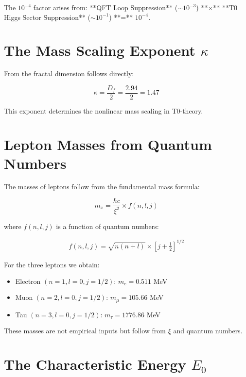 \documentclass[12pt,a4paper]{report}
\begin{document}
The $10^{-4}$ factor arises from: **QFT Loop Suppression** ($\sim 10^{-3}$) **×** **T0 Higgs Sector Suppression** ($\sim 10^{-1}$) **=** $10^{-4}$.

	\section{The Mass Scaling Exponent $\kappa$}
	
	From the fractal dimension follows directly:
	
	\begin{equation}
		\kappa = \frac{D_f}{2} = \frac{2.94}{2} = 1.47
	\end{equation}
	
	This exponent determines the nonlinear mass scaling in T0-theory.
	
	\section{Lepton Masses from Quantum Numbers}
	
	The masses of leptons follow from the fundamental mass formula:
	
	\begin{equation}
		m_x = \frac{\hbar c}{\xi^2} \times f(n, l, j)
	\end{equation}
	
	where $f(n, l, j)$ is a function of quantum numbers:
	
	\begin{align}
		f(n, l, j) = \sqrt{n(n+l)} \times \left[j + \frac{1}{2}\right]^{1/2}
	\end{align}
	
	For the three leptons we obtain:
	
	\begin{itemize}
		\item Electron $(n=1, l=0, j=1/2)$: $m_e = 0.511$ MeV
		\item Muon $(n=2, l=0, j=1/2)$: $m_\mu = 105.66$ MeV
		\item Tau $(n=3, l=0, j=1/2)$: $m_\tau = 1776.86$ MeV
	\end{itemize}
	
	These masses are not empirical inputs but follow from $\xi$ and quantum numbers.
	
	\section{The Characteristic Energy $E_0$}
	
\end{document}
